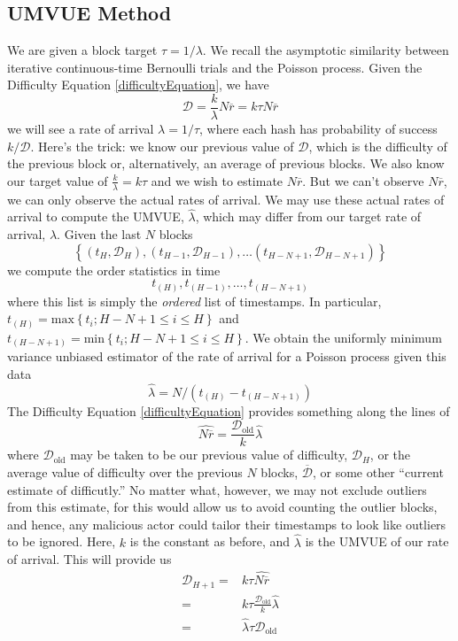 \documentclass[12pt,english]{mrl}
\theoremstyle{definition}
\renewcommand{\leq}{\leqslant}
\numberwithin{equation}{section}
\numberwithin{figure}{section}
\numberwithin{equation}{section}
\numberwithin{equation}{section}
\numberwithin{figure}{section}
\begin{document}
\subsection{UMVUE Method}
We are given a block target $\tau=1/\lambda$. We recall the asymptotic similarity between iterative continuous-time Bernoulli trials and the Poisson process. Given the Difficulty Equation \ref{difficultyEquation}, we have
\[\mathcal{D} = \frac{k}{\lambda} N\overline{r} = k\tau N\overline{r}\]
we will see a rate of arrival $\lambda=1/\tau$, where each hash has probability of success $k/\mathcal{D}$. Here's the trick: we know our previous value of $\mathcal{D}$, which is the difficulty of the previous block or, alternatively, an average of previous blocks. We also know our target value of $\frac{k}{\lambda}=k\tau$ and we wish to estimate $N\overline{r}$. But we can't observe $N\overline{r}$, we can only observe the actual rates of arrival. We may use these actual rates of arrival to compute the UMVUE, $\hat{\lambda}$, which may differ from our target rate of arrival, $\lambda$. Given the last $N$ blocks
\[\left\{(t_{H}, \mathcal{D}_{H}), (t_{H-1}, \mathcal{D}_{H-1}), \ldots (t_{H-N+1}, \mathcal{D}_{H-N+1})\right\}\]
we compute the order statistics in time
\[t_{(H)}, t_{(H-1)}, \ldots, t_{(H-N+1)}\]
where this list is simply the \textit{ordered} list of timestamps. In particular, $t_{(H)} = \text{max}\left\{t_i;H-N+1 \leq i \leq H\right\}$ and $t_{(H-N+1)} = \text{min}\left\{t_i; H-N+1 \leq i \leq H\right\}$. We obtain the uniformly minimum variance unbiased estimator of the rate of arrival for a Poisson process given this data 
\[\widehat{\lambda} = N/(t_{(H)} - t_{(H-N+1)})\]
The Difficulty Equation \ref{difficultyEquation} provides something along the lines of 
\[\widehat{N\overline{r}} = \frac{\mathcal{D}_{\text{old}}}{k} \hat{\lambda}\]
where $\mathcal{D}_{\text{old}}$ may be taken to be our previous value of difficulty, $\mathcal{D}_H$, or the average value of difficulty over the previous $N$ blocks, $\overline{\mathcal{D}}$, or some other ``current estimate of difficutly.'' No matter what, however, we may not exclude outliers from this estimate, for this would allow us to avoid counting the outlier blocks, and hence, any malicious actor could tailor their timestamps to look like outliers to be ignored. Here, $k$ is the constant as before, and $\hat{\lambda}$ is the UMVUE of our rate of arrival. This will provide us
\begin{align*}
\mathcal{D}_{H+1} =& k\tau \widehat{N\overline{r}}\\
=& k\tau \frac{\mathcal{D}_{\text{old}}}{k}\hat{\lambda}\\
=& \hat{\lambda}\tau \mathcal{D}_{\text{old}}
\end{align*}
\end{document}
